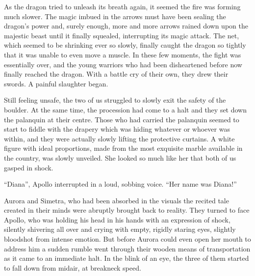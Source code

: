 As the dragon tried to unleash its breath again, it seemed the fire was forming much slower. The magic imbued in the arrows must have been sealing the dragon's power and, surely enough, more and more arrows rained down upon the majestic beast until it finally squealed, interrupting its magic attack. The net, which seemed to be shrinking ever so slowly, finally caught the dragon so tightly that it was unable to even move a muscle. In these few moments, the fight was essentially over, and the young warriors who had been disheartened before now finally reached the dragon. With a battle cry of their own, they drew their swords. A painful slaughter began.

Still feeling unsafe, the two of us struggled to slowly exit the safety of the boulder. At the same time, the procession had come to a halt and they set down the palanquin at their centre. Those who had carried the palanquin seemed to start to fiddle with the drapery which was hiding whatever or whoever was within, and they were actually slowly lifting the protective curtains. A white figure with ideal proportions, made from the most exquisite marble available in the country, was slowly unveiled. She looked so much like her that both of us gasped in shock.

\froufrou{}

\enquote{Diana}, Apollo interrupted in a loud, sobbing voice. \enquote{Her name was Diana!}

Aurora and Simetra, who had been absorbed in the visuals the recited tale created in their minds were abruptly brought back to reality. They turned to face Apollo, who was holding his head in his hands with an expression of shock, silently shivering all over and crying with empty, rigidly staring eyes, slightly bloodshot from intense emotion. But before Aurora could even open her mouth to address him a sudden rumble went through their wooden means of transportation as it came to an immediate halt. In the blink of an eye, the three of them started to fall down from midair, at breakneck speed.
